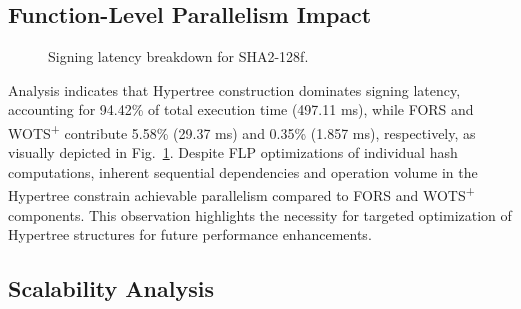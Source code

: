 \documentclass[journal]{IEEEtran}
\begin{document}
\subsection{Function-Level Parallelism Impact}

\begin{figure}[h]
  \centering
  \caption{Signing latency breakdown for SHA2-128f.}
  \label{fig:flp_pie}
\end{figure}

Analysis indicates that Hypertree construction dominates signing latency, accounting for 94.42\% of total execution time (497.11 ms), while FORS and WOTS\textsuperscript{+} contribute 5.58\% (29.37 ms) and 0.35\% (1.857 ms), respectively, as visually depicted in Fig.~\ref{fig:flp_pie}. Despite FLP optimizations of individual hash computations, inherent sequential dependencies and operation volume in the Hypertree constrain achievable parallelism compared to FORS and WOTS\textsuperscript{+} components. This observation highlights the necessity for targeted optimization of Hypertree structures for future performance enhancements.

\subsection{Scalability Analysis}
\end{document}
